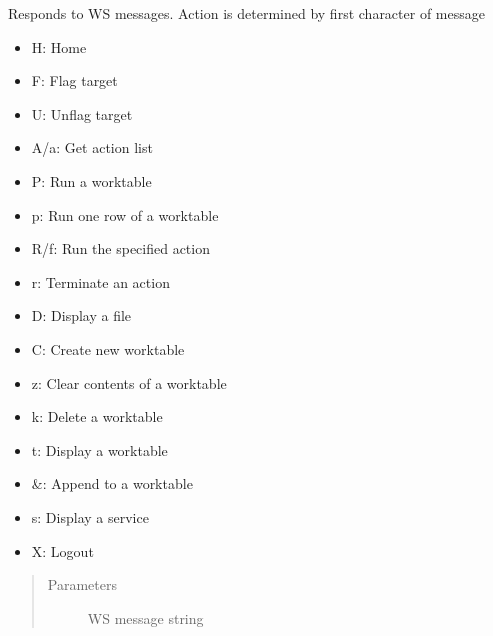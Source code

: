 \documentclass[letterpaper,10pt,english]{sphinxmanual}
\begin{document}
\begin{fulllineitems}
\begin{fulllineitems}
\begin{quote}
\begin{description}
\end{description}\end{quote}

\end{fulllineitems}


\begin{fulllineitems}
\label{\detokenize{funcs:backend.SocketHandler.on_message}}
Responds to WS messages. Action is determined by first character
of message
\begin{itemize}
\item {} 
H: Home

\item {} 
F: Flag target

\item {} 
U: Unflag target

\item {} 
A/a: Get action list

\item {} 
P: Run a worktable

\item {} 
p: Run one row of a worktable

\item {} 
R/f: Run the specified action

\item {} 
r: Terminate an action

\item {} 
D: Display a file

\item {} 
C: Create new worktable

\item {} 
z: Clear contents of a worktable

\item {} 
k: Delete a worktable

\item {} 
t: Display a worktable

\item {} 
\&: Append to a worktable

\item {} 
s: Display a service

\item {} 
X: Logout

\end{itemize}
\begin{quote}\begin{description}
\item[{Parameters}] \leavevmode
{} \textendash{} WS message string


\end{description}
\end{quote}
\end{fulllineitems}
\end{fulllineitems}
\end{document}

